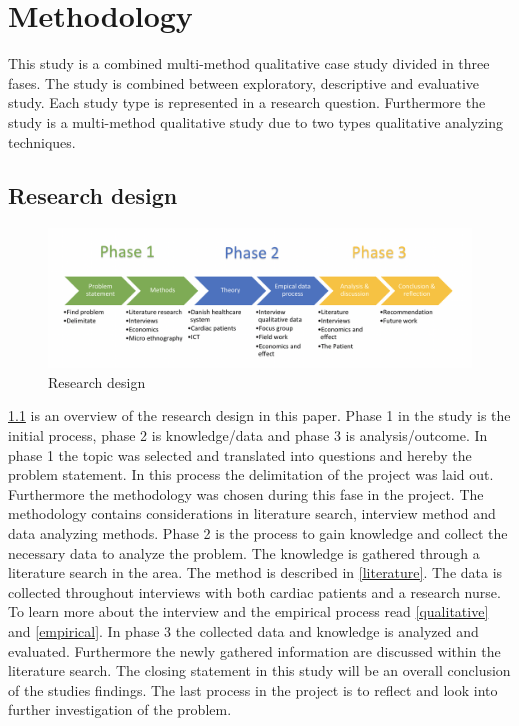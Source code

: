 \chapter{Methodology}

This study is a combined multi-method qualitative case study divided in three fases.
The study is combined between exploratory, descriptive and evaluative study. Each study type is represented in a research question. Furthermore the study is a multi-method qualitative study due to two types qualitative analyzing techniques. 
\section{Research design}

\begin{figure}[H]
\centering
\includegraphics[width=1.10\textwidth]{Figure/researchdesign.png}
\caption{Research design}
\label{fig:Researchdesign}
\end{figure} 

\cref{fig:Researchdesign} is an overview of the research design in this paper.
 Phase 1 in the study is the initial process, phase 2 is knowledge/data and phase 3 is analysis/outcome. 
In phase 1 the topic was selected and translated into questions and hereby the problem statement. In this process the delimitation of the project was laid out. Furthermore the methodology was chosen during this fase in the project. The methodology contains considerations in literature search, interview method and data analyzing methods. 
Phase 2 is the process to gain knowledge and collect the necessary data to analyze the problem. The knowledge is gathered through a literature search in the area. The method is described in \cref{literature}. The data is collected throughout interviews with both cardiac patients and a research nurse. To learn more about the interview and the empirical process read \cref{qualitative} and \cref{empirical}.
In phase 3 the collected data and knowledge is analyzed and evaluated. Furthermore the newly gathered information are discussed within the literature search. The closing statement in this study will be an overall conclusion of the studies findings. The last process in the project is to reflect and look into further investigation of the problem. 


